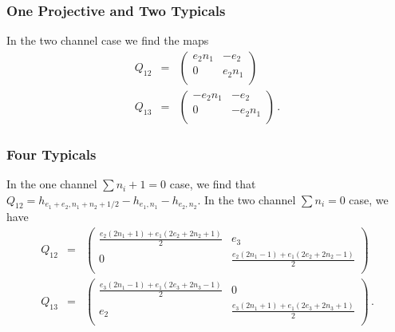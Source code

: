 \documentclass[12pt]{article}
\numberwithin{equation}{section}
\numberwithin{equation}{section}
\numberwithin{table}{section}\setlength{\multlinegap}{25pt}
\begin{document}
\subsubsection{One Projective and Two Typicals}
In the two channel case we find the maps
\begin{eqnarray}
Q_{12} &=& \left(
\begin{array}{cc}
 e_2 n_1 & -e_2 \\
0 & e_2 n_1 \\
\end{array}
\right)
\nonumber \\
Q_{13} &=& \left(
\begin{array}{cc}
 -e_2 n_1 & -e_2 \\
 0 & -e_2 n_1 \\
\end{array}
\right) \, .
\end{eqnarray}
\subsubsection{Four Typicals}
In the one channel $\sum n_i+1=0$ case, we find that
$Q_{12}=h_{e_1+e_2,n_1+n_2+1/2} - h_{e_1,n_1}-h_{e_2,n_2}$.
In the two channel $\sum n_i=0$ case, we have
\begin{eqnarray}
Q_{12} &=&
\left(
\begin{array}{cc}
 \frac{e_2  \left(2 n_1+1 \right)+e_1 \left(2 e_2+2  n_2+1\right)}{2} & e_3 \\
 0 & \frac{e_2  \left(2 n_1-1\right)+e_1 \left(2 e_2+ 2 n_2-1\right)}{2} \\
\end{array}
\right)
\nonumber \\
Q_{13} &=& \left(
\begin{array}{cc}
 \frac{e_3  \left(2 n_1-1\right)+e_1 \left(2 e_3+ 2 n_3-1\right)}{2 } & 0 \\
 e_2 & \frac{e_3  \left(2 n_1+1\right)+e_1 \left(2 e_3+2  n_3+1\right)}{2 } \\
\end{array}
\right) \, .
\end{eqnarray}
\end{document}
